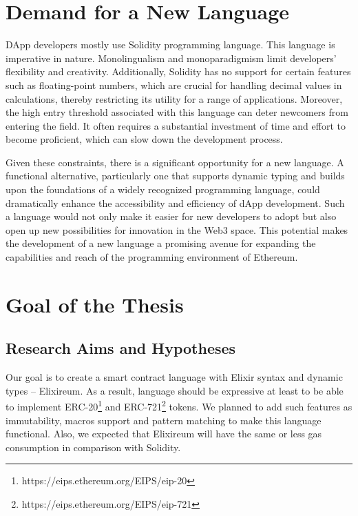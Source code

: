 \section{Demand for a New Language}
\label{sec:langdemand}

DApp developers mostly use Solidity programming language. This language is imperative in nature. Monolingualism and monoparadigmism limit developers' flexibility and creativity. Additionally, Solidity has no support for certain features such as floating-point numbers, which are crucial for handling decimal values in calculations, thereby restricting its utility for a range of applications. Moreover, the high entry threshold associated with this language can deter newcomers from entering the field. It often requires a substantial investment of time and effort to become proficient, which can slow down the development process.

Given these constraints, there is a significant opportunity for a new language. A functional alternative, particularly one that supports dynamic typing and builds upon the foundations of a widely recognized programming language, could dramatically enhance the accessibility and efficiency of dApp development. Such a language would not only make it easier for new developers to adopt but also open up new possibilities for innovation in the Web3 space. This potential makes the development of a new language a promising avenue for expanding the capabilities and reach of the programming environment of Ethereum.

\section{Goal of the Thesis}
\label{sec:goal}

\subsection{Research Aims and Hypotheses}
Our goal is to create a smart contract language with Elixir syntax and dynamic types -- Elixireum. As a result, language should be expressive at least to be able to implement ERC-20\footnote{https://eips.ethereum.org/EIPS/eip-20} and ERC-721\footnote{https://eips.ethereum.org/EIPS/eip-721} tokens. We planned to add such features as immutability, macros support and pattern matching to make this language functional. Also, we expected that Elixireum will have the same or less gas consumption in comparison with Solidity.

